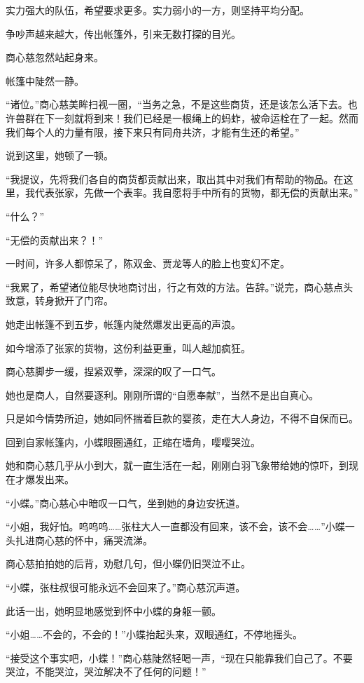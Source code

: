 \begin{this_body}
实力强大的队伍，希望要求更多。实力弱小的一方，则坚持平均分配。

争吵声越来越大，传出帐篷外，引来无数打探的目光。

商心慈忽然站起身来。

帐篷中陡然一静。

“诸位。”商心慈美眸扫视一圈，“当务之急，不是这些商货，还是该怎么活下去。也许兽群在下一刻就将到来！我们已经是一根绳上的蚂蚱，被命运栓在了一起。然而我们每个人的力量有限，接下来只有同舟共济，才能有生还的希望。”

说到这里，她顿了一顿。

“我提议，先将我们各自的商货都贡献出来，取出其中对我们有帮助的物品。在这里，我代表张家，先做一个表率。我自愿将手中所有的货物，都无偿的贡献出来。”

“什么？”

“无偿的贡献出来？！”

一时间，许多人都惊呆了，陈双金、贾龙等人的脸上也变幻不定。

“我累了，希望诸位能尽快地商讨出，行之有效的方法。告辞。”说完，商心慈点头致意，转身掀开了门帘。

她走出帐篷不到五步，帐篷内陡然爆发出更高的声浪。

如今增添了张家的货物，这份利益更重，叫人越加疯狂。

商心慈脚步一缓，捏紧双拳，深深的叹了一口气。

她也是商人，自然要逐利。刚刚所谓的“自愿奉献”，当然不是出自真心。

只是如今情势所迫，她如同怀揣着巨款的婴孩，走在大人身边，不得不自保而已。

回到自家帐篷内，小蝶眼圈通红，正缩在墙角，嘤嘤哭泣。

她和商心慈几乎从小到大，就一直生活在一起，刚刚白羽飞象带给她的惊吓，到现在才爆发出来。

“小蝶。”商心慈心中暗叹一口气，坐到她的身边安抚道。

“小姐，我好怕。呜呜呜……张柱大人一直都没有回来，该不会，该不会……”小蝶一头扎进商心慈的怀中，痛哭流涕。

商心慈拍拍她的后背，劝慰几句，但小蝶仍旧哭泣不止。

“小蝶，张柱叔很可能永远不会回来了。”商心慈沉声道。

此话一出，她明显地感觉到怀中小蝶的身躯一颤。

“小姐……不会的，不会的！”小蝶抬起头来，双眼通红，不停地摇头。

“接受这个事实吧，小蝶！”商心慈陡然轻喝一声，“现在只能靠我们自己了。不要哭泣，不能哭泣，哭泣解决不了任何的问题！”


\end{this_body}
